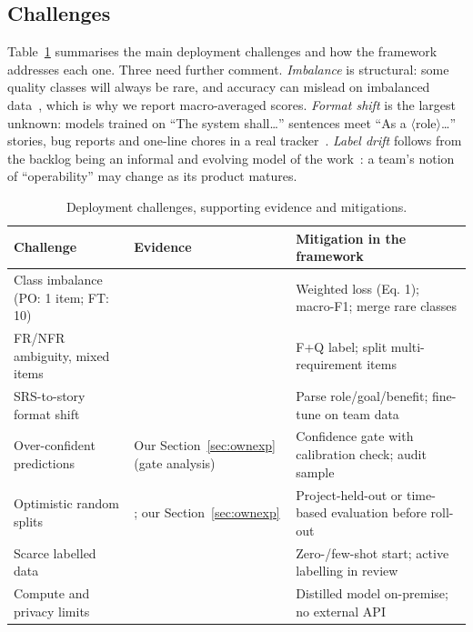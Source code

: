 \documentclass[conference,10pt,letterpaper]{IEEEtran}
\begin{document}
\subsection{Challenges}
Table~\ref{tab:chal} summarises the main deployment challenges and how the framework addresses each one. Three need further comment. \emph{Imbalance} is structural: some quality classes will always be rare, and accuracy can mislead on imbalanced data~\cite{johnson2019}, which is why we report macro-averaged scores. \emph{Format shift} is the largest unknown: models trained on “The system shall…” sentences meet “As a $\langle$role$\rangle$…” stories, bug reports and one-line chores in a real tracker~\cite{vancan2025}. \emph{Label drift} follows from the backlog being an informal and evolving model of the work~\cite{sedano2019}: a team's notion of “operability” may change as its product matures.

\begin{table}[!t]
\centering
\caption{Deployment challenges, supporting evidence and mitigations.}
\label{tab:chal}
\scriptsize
\setlength{\tabcolsep}{3pt}
\renewcommand{\arraystretch}{1.12}
\begin{tabular}{>{\raggedright\arraybackslash}p{2.35cm}>{\raggedright\arraybackslash}p{2.0cm}>{\raggedright\arraybackslash}p{3.2cm}}
\toprule
\textbf{Challenge} & \textbf{Evidence} & \textbf{Mitigation in the framework} \\
\midrule
Class imbalance (PO: 1 item; FT: 10) & \cite{johnson2019} & Weighted loss (Eq. 1); macro-F1; merge rare classes \\
FR/NFR ambiguity, mixed items & \cite{dalpiaz2019,vancan2025} & F+Q label; split multi-requirement items \\
SRS-to-story format shift & \cite{lucassen2016use,vancan2025} & Parse role/goal/benefit; fine-tune on team data \\
Over-confident predictions & Our Section~\ref{sec:ownexp} (gate analysis) & Confidence gate with calibration check; audit sample \\
Optimistic random splits & \cite{hey2022corrected}; our Section~\ref{sec:ownexp} & Project-held-out or time-based evaluation before roll-out \\
Scarce labelled data & \cite{alhoshan2023,tunstall2022setfit} & Zero-/few-shot start; active labelling in review \\
Compute and privacy limits & \cite{sanh2019distilbert} & Distilled model on-premise; no external API \\
\bottomrule
\end{tabular}
\end{table}
\end{document}
